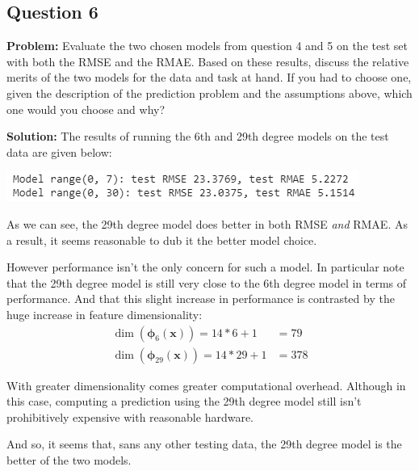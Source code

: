 \documentclass{article}
\renewcommand{\vec}[1]{\mathbf{#1}}
\begin{document}
\subsection*{Question 6}
\noindent\textbf{Problem:} Evaluate the two chosen models from question 4 and 5 on the test set with both the RMSE and the RMAE. Based on these results, discuss the relative merits of the two models for the data and task at hand. If you had to choose one, given the description of the prediction problem and the assumptions above, which one would you choose and why?
\bigskip

\noindent\textbf{Solution:} The results of running the 6th and 29th degree models on the test data are given below:
\begin{center}
    \includegraphics[scale=.95]{fig3.png}
\end{center}

As we can see, the 29th degree model does better in both RMSE \textit{and} RMAE. As a result, it seems reasonable to dub it the better model choice.

However performance isn't the only concern for such a model. In particular note that the 29th degree model is still very close to the 6th degree model in terms of performance. And that this slight increase in performance is contrasted by the huge increase in feature dimensionality:
\begin{align*}
    \operatorname{dim}(\bm{\phi}_6(\vec x))=14*6+1&=79\\
    \operatorname{dim}(\bm{\phi}_{29}(\vec x))=14*29+1&=378
\end{align*}

With greater dimensionality comes greater computational overhead. Although in this case, computing a prediction using the 29th degree model still isn't prohibitively expensive with reasonable hardware.

And so, it seems that, sans any other testing data, the 29th degree model is the better of the two models.
\end{document}
